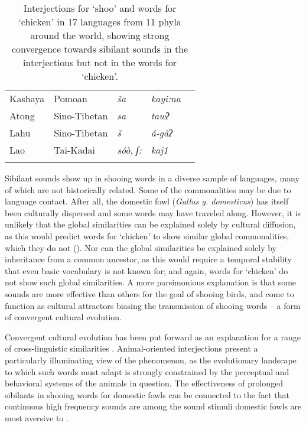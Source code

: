 \documentclass[output=paper]{langsci/langscibook}
\begin{document}
\begin{table}
\begin{tabularx}{\textwidth}{llllr}
Kashaya & Pomoan & \textit{ša} & \textit{kayi:na} & \citealt{oswalt_interjections_2002}\\
Atong & Sino-Tibetan & \textit{sa} & \textit{tawʔ} & \citealt{breugel_grammar_2014}\\
Lahu & Sino-Tibetan & \textit{š} & \textit{á-gâʔ} & \citealt{matisoff_dictionary_1988}\\
Lao & Tai-Kadai & \textit{sóò}, \textit{ʃ:} & \textit{kaj1} & \citealt{enfield_grammar_2007}\\
\lspbottomrule
\end{tabularx}
\caption{Interjections for ‘shoo’ and words for ‘chicken’ in 17 languages from 11 phyla around the world, showing strong convergence towards sibilant sounds in the interjections but not in the words for ‘chicken’.}
\label{tab:dingemanse:5}
\end{table}

Sibilant sounds show up in shooing words in a diverse sample of languages, many of which are not historically related. Some of the commonalities may be due to language contact. After all, the domestic fowl (\textit{Gallus g. domesticus}) has itself been culturally dispersed \citep{liu_multiple_2006} and some words may have traveled along. However, it is unlikely that the global similarities can be explained solely by cultural diffusion, as this would predict words for ‘chicken’ to show similar global commonalities, which they do not (). Nor can the global similarities be explained solely by inheritance from a common ancestor, as this would require a temporal stability that even basic vocabulary is not known for; and again, words for ‘chicken’ do not show such global similarities. A more parsimonious explanation is that some sounds are more effective than others for the goal of shooing birds, and come to function as cultural attractors biasing the transmission of shooing words -- a form of convergent cultural evolution.

Convergent cultural evolution has been put forward as an explanation for a range of cross-linguistic similarities \citep{caldwell_convergent_2008,dingemanse_is_2013,blythe_genesis_2018}. Animal-oriented interjections present a particularly illuminating view of the phenomenon, as the evolutionary landscape to which such words must adapt is strongly constrained by the perceptual and behavioral systems of the animals in question. The effectiveness of prolonged sibilants in shooing words for domestic fowls can be connected to the fact that continuous high frequency sounds are among the sound stimuli domestic fowls are most aversive to \citep{MacKenzieEtAlI}.
\end{document}
